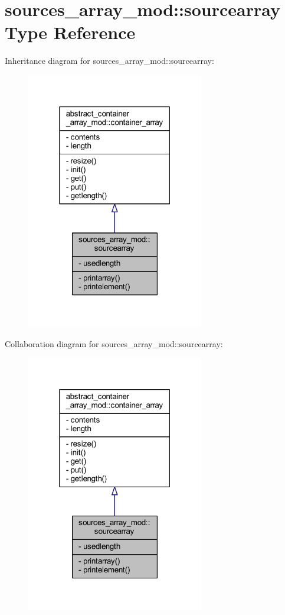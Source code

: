 \hypertarget{structsources__array__mod_1_1sourcearray}{}\section{sources\+\_\+array\+\_\+mod\+:\+:sourcearray Type Reference}
\label{structsources__array__mod_1_1sourcearray}


Inheritance diagram for sources\+\_\+array\+\_\+mod\+:\+:sourcearray\+:\nopagebreak
\begin{figure}[H]
\begin{center}
\leavevmode
\includegraphics[width=220pt]{structsources__array__mod_1_1sourcearray__inherit__graph}
\end{center}
\end{figure}


Collaboration diagram for sources\+\_\+array\+\_\+mod\+:\+:sourcearray\+:\nopagebreak
\begin{figure}[H]
\begin{center}
\leavevmode
\includegraphics[width=220pt]{structsources__array__mod_1_1sourcearray__coll__graph}
\end{center}
\end{figure}
